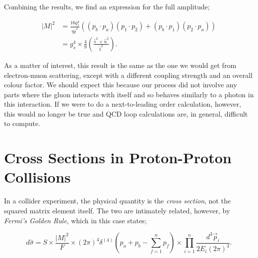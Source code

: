 Combining the results, we find an expression for the full amplitude;

\begin{equation}
\begin{split}
|M|^2 &= \frac{16 g_s^4}{9 \hat{t}^2} \left((p_b \cdot p_a)(p_1 \cdot p_2) + (p_b \cdot p_1)(p_2 \cdot p_a) \right) \\
&= g_s^4 \times \frac{4}{9} \left(\frac{\hat{s}^2 + \hat{u}^2}{\hat{t}^2} \right).
\end{split}
\label{eqn:qQ_qQ_LO}
\end{equation}

As a matter of interest, this result is the same as the one we would get from electron-muon scattering, except with a different coupling strength and an overall colour factor. We should expect this because our process did not involve any parts where the gluon interacts with itself and so behaves similarly to a photon in this interaction. If we were to do a next-to-leading order calculation, however, this would no longer be true and QCD loop calculations are, in general, difficult to compute.

\section{Cross Sections in Proton-Proton Collisions}

In a collider experiment, the physical quantity is the \emph{cross section}, not the squared matrix element itself. The two are intimately related, however, by \emph{Fermi's Golden Rule}, which in this case states;

\begin{equation}
d \hat{\sigma} = S \times \frac{|M|^2}{F} \times (2 \pi)^4 \delta^{(4)}(p_a + p_b - \sum_{f=1}^n p_f) \times \prod_{i=1}^n \frac{d^3 \vec{p}_i}{2 E_i (2 \pi)^3}.
\end{equation}

